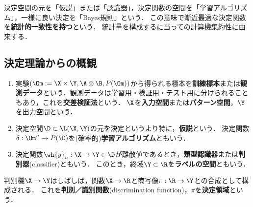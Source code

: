 \documentclass[uplatex,dvipdfmx]{jsreport}
\begin{document}
\begin{tcolorbox}[colframe=ForestGreen, colback=ForestGreen!10!white,breakable,colbacktitle=ForestGreen!40!white,coltitle=black,fonttitle=\bfseries\sffamily,
title=]
    決定空間の元を「仮説」または「認識器」，決定関数の空間を「学習アルゴリズム」，一様に良い決定を「Bayes規則」という．
    この意味で漸近最適な決定関数を\textbf{統計的一致性を持つ}という．
    統計量を構成するに当っての計算機集約性に由来する．
\end{tcolorbox}

\subsection{決定理論からの概観}

\begin{definition}[統計的決定理論との対応]\mbox{}
    \begin{enumerate}
        \item 実験$(\Om:=\X\times\Y,\A\otimes\B,P(\Om))$から得られる標本を\textbf{訓練標本}または\textbf{観測データ}という．観測データは学習用・検証用・テスト用に分けられることもあり，これを\textbf{交差検証法}という．
        $\X$を\textbf{入力空間}または\textbf{パターン空間}，$\Y$を出力空間という．
        \item 決定空間$\D\subset\L(\X,\Y)$の元を決定というより特に，\textbf{仮説}という．
        決定関数$\delta:\Om^n\to P(\D)$を(確率的)\textbf{学習アルゴリズム}ともいう．
        \item 決定関数$\wh{y}_n:\X\to\Y\in\D$が離散値であるとき，\textbf{類型認識器}または\textbf{判別器}(classifier)ともいう．
        このとき，終域$\Y\subset\R$を\textbf{ラベルの空間}ともいう．
    \end{enumerate}
\end{definition}
\begin{remark}
    判別機$\X\to\Y$はしばしば，関数$\X\to\R$と商写像$\pi:\R\to\Y$との合成として構成される．
    これを\textbf{判別／識別関数}(discrimination function)，$\pi$を\textbf{決定領域}という．
\end{remark}
\end{document}
